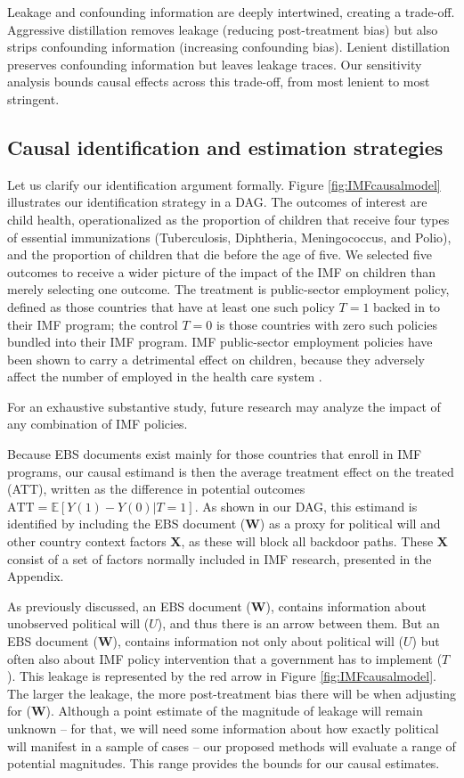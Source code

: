 \documentclass[11pt]{article}
\newcommand{\E}{\mathbb{E}}
\newcommand{\bX}{\bm{X}} %
\newcommand{\bW}{\bm{W}}  %
\begin{document}
Leakage and confounding information are deeply intertwined, creating a trade-off. Aggressive distillation removes leakage (reducing post-treatment bias) but also strips confounding information (increasing confounding bias). Lenient distillation preserves confounding information but leaves leakage traces. Our sensitivity analysis bounds causal effects across this trade-off, from most lenient to most stringent.


\subsection{Causal identification and estimation strategies}

Let us clarify our identification argument formally. Figure \ref{fig:IMFcausalmodel} illustrates our identification strategy in a DAG. The outcomes of interest are child health, operationalized as the proportion of children that receive four types of essential immunizations (Tuberculosis, Diphtheria, Meningococcus, and Polio), and the proportion of children that die before the age of five. We selected five outcomes to receive a wider picture of the impact of the IMF on children than merely selecting one outcome. The treatment is public-sector employment policy, defined as those countries that have at least one such policy $T=1$ backed in to their IMF program; the control $T=0$ is those countries with zero such policies bundled into their IMF program. IMF public-sector employment policies have been shown to carry a detrimental effect on children, because they adversely affect the number of employed in the health care system \citep{daoudReinsberg2018,daoudImpactInternationalMonetary2017}.

For an exhaustive substantive study, future research may analyze the impact of any combination of IMF policies.

Because EBS documents exist mainly for those countries that enroll in IMF programs, our causal estimand is then the average treatment effect on the treated (ATT), written as the difference in potential outcomes $\textrm{ATT}=\E[Y(1) - Y(0)|T=1]$. As shown in our DAG, this estimand is identified by including the EBS document ($\bW$) as a proxy for political will and other country context factors $\bX$, as these will block all backdoor paths. These $\bX$ consist of a set of factors normally included in IMF research, presented in the Appendix.

As previously discussed, an EBS document ($\bW$), contains information about unobserved political will ($U$), and thus there is an arrow between them. But an EBS document ($\bW$), contains information not only about political will ($U$) but often also about IMF policy intervention that a government has to implement ($T$). This leakage is represented by the red arrow in Figure \ref{fig:IMFcausalmodel}. The larger the leakage, the more post-treatment bias there will be when adjusting for ($\bW$). Although a point estimate of the magnitude of leakage will remain unknown -- for that, we will need some information about how exactly political will manifest in a sample of cases -- our proposed methods will evaluate a range of potential magnitudes. This range provides the bounds for our causal estimates.
\end{document}
